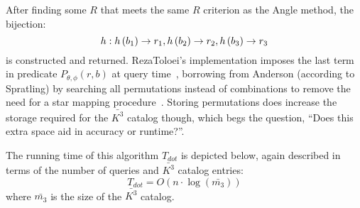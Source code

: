After finding some $R$ that meets the same $R$ criterion as the Angle method, the bijection:
\begin{equation}
    h: h\left(b_1\right) \rightarrow r_1, h\left(b_2\right) \rightarrow r_2, h\left(b_3\right)
    \rightarrow r_3
\end{equation}
is constructed and returned.
RezaToloei's implementation imposes the last term in predicate $P_{\theta, \phi}(r, b)$ at query
time~\cite{toloei:compositeIdentification}, borrowing from Anderson (according to Spratling) by searching all
permutations instead of combinations to remove the need for a star mapping
procedure~\cite{anderson:autonomousStarSensing}.
Storing permutations does increase the storage required for the $\bar{K^3}$ catalog though, which begs the question,
``Does this extra space aid in accuracy or runtime?''.

%

The running time of this algorithm $T_{dot}$ is depicted below, again described in terms of the number of queries
and $\bar{K^3}$ catalog entries:
\begin{equation}\label{eq:dotComplexity}
    T_{dot} = O\left( n \cdot \log(\bar{m_3}) \right)
\end{equation}
where $\bar{m_3}$ is the size of the $\bar{K^3}$ catalog.


